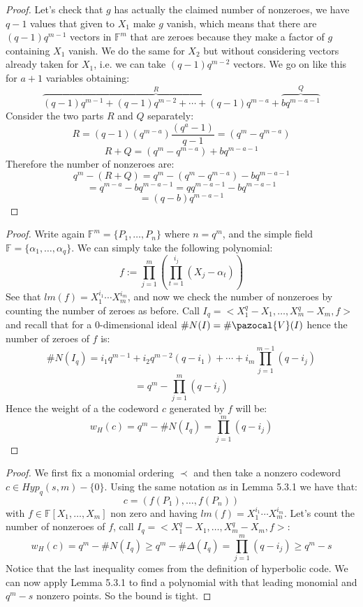 \documentclass[11pt,a4paper]{report}
\theoremstyle{plain}
\theoremstyle{definition}
\newcommand{\V}{\pazocal{V}}
\begin{document}
\begin{ex-hand}[5.8.2]
\end{ex-hand}
\begin{proof}
	Let's check that $g$ has actually the claimed number of nonzeroes, we have $q-1$ values that given to $X_1$ make $g$ vanish, which means that there are $(q-1)q^{m-1}$ vectors in $\mathbb{F}^m$ that are zeroes because they make a factor of $g$ containing $X_1$ vanish. We do the same for $X_2$ but without considering vectors already taken for $X_1$, i.e. we can take $(q-1)q^{m-2}$ vectors. We go on like this for $a+1$ variables obtaining:
	\[
		\overbrace{(q-1)q^{m-1} + (q-1)q^{m-2} + \cdots + (q-1)q^{m-a}}^R + \overbrace{bq^{m-a-1}}^Q
	\]
	Consider the two parts $R$ and $Q$ separately:
	\[
		R = (q-1)(q^{m-a})\frac{(q^a - 1)}{q-1} = (q^m - q^{m-a})
	\]
	\[
		R + Q = (q^m - q^{m-a}) + bq^{m-a-1}
	\]
	Therefore the number of nonzeroes are:
	\[
		q^m - (R+Q) = q^m - (q^m - q^{m-a}) - bq^{m-a-1} 
	\]
	\[
		= q^{m-a} - bq^{m-a-1} = qq^{m-a-1} - bq^{m-a-1}
	\]
	\[
		= (q-b)q^{m-a-1}	
	\]
\end{proof}

\begin{lem-hand}[5.3.1]
\end{lem-hand}
\begin{proof}
	Write again $\mathbb{F}^m = \{P_1,\ldots,P_n\}$ where $n = q^m$, and the simple field $\mathbb{F} = \{\alpha_1,\ldots,\alpha_q\}$.
	We can simply take the following polynomial:
	\[
		f := \prod\limits_{j=1}^m\left( \prod\limits_{t=1}^{i_j}(X_j - \alpha_t)\right)	
	\]
	See that $lm(f) = X_1^{i_1}\cdots X_m^{i_m}$, and now we check the number of nonzeroes by counting the number of zeroes as before. Call $I_q = <X_1^q - X_1, \ldots, X_m^q - X_m, f>$ and recall that for a 0-dimensional ideal $\#N(I) = \#\V(I)$ hence the number of zeroes of $f$ is:
	\[
		\#N(I_q) = i_1q^{m-1} + i_2q^{m-2}(q - i_1) + \cdots + i_m\prod\limits_{j=1}^{m-1}(q - i_j)
	\]
	\[
		=	q^m - \prod\limits_{j=1}^{m}(q - i_j)
	\]
	Hence the weight of a the codeword $c$ generated by $f$ will be:
	\[
		w_H(c)	 = q^m - \#N(I_q) = \prod\limits_{j=1}^{m}(q - i_j)
	\]
\end{proof}

\begin{thm-hand}[5.3.2]
\end{thm-hand}
\begin{proof}
	We first fix a monomial ordering $\prec$ and then take a nonzero codeword $c \in Hyp_q(s,m) - \{0\}$. Using the same notation as in Lemma 5.3.1 we have that:
	\[
		c = (f(P_1),\ldots,f(P_n))	
	\]
	with $f \in \mathbb{F}[X_1,\ldots,X_m]$ non zero and having $lm(f) = X_1^{i_1}\cdots X_m^{i_m}$. Let's count the number of nonzeroes of $f$, call $I_q = <X_1^q - X_1, \ldots, X_m^q - X_m, f>$:
	\[
		w_H(c) = q^m - \#N(I_q) \ge q^m - \#\Delta(I_q)	= \prod\limits_{j=1}^m(q - i_j) \ge q^m -s
	\]
	Notice that the last inequality comes from the definition of hyperbolic code.
	We can now apply Lemma 5.3.1 to find a polynomial with that leading monomial and $q^m - s$ nonzero points. So the bound is tight.
\end{proof}
\end{document}
